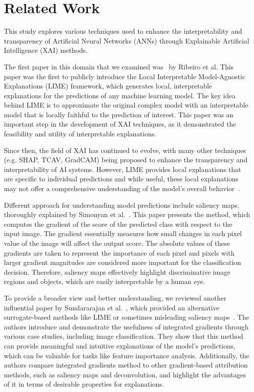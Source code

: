 \documentclass[journal, a4paper]{IEEEtran}
\begin{document}
\section{Related Work}\label{sec:related-work}
This study explores various techniques used to enhance the interpretability and transparency of Artificial Neural Networks (ANNs) through Explainable Artificial Intelligence (XAI) methods.

The first paper in this domain that we examined was~\cite{ribeiro2016should} by Ribeiro et al.
This paper was the first to publicly introduce the Local Interpretable Model-Agnostic Explanations (LIME) framework, which generates local, interpretable explanations for the predictions of any machine learning model.
The key idea behind LIME is to approximate the original complex model with an interpretable model that is locally faithful to the prediction of interest.
This paper was an important step in the development of XAI techniques, as it demonstrated the feasibility and utility of interpretable explanations.

Since then, the field of XAI has continued to evolve, with many other techniques (e.g. SHAP, TCAV, GradCAM) being proposed to enhance the transparency and interpretability of AI systems.
However, LIME provides local explanations that are specific to individual predictions and while useful, these local explanations may not offer a comprehensive understanding of the model's overall behavior~\cite{NIPS2017_8a20a862}.

Different approach for understanding model predictions include saliency maps, thoroughly explained by Simonyan et al.~\cite{Simonyan14a}.
This paper presents the method, which computes the gradient of the score of the predicted class with respect to the input image.
The gradient essentially measures how small changes in each pixel value of the image will affect the output score.
The absolute values of these gradients are taken to represent the importance of each pixel and pixels with larger gradient magnitudes are considered more important for the classification decision.
Therefore, saliency maps effectively highlight discriminative image regions and objects, which are easily interpretable by a human eye.

To provide a broader view and better understanding, we reviewed another influential paper by Sundararajan et al.~\cite{ribeiro2016should}, which provided an alternative surrogate-based methods like LIME or sometimes misleading saliency maps~\cite{adebayo2018sanity}.
The authors introduce and demonstrate the usefulness of integrated gradients through various case studies, including image classification.
They show that this method can provide meaningful and intuitive explanations of the model's predictions, which can be valuable for tasks like feature importance analysis.
Additionally, the authors compare integrated gradients method to other gradient-based attribution methods, such as saliency maps and deconvolution, and highlight the advantages of it in terms of desirable properties for explanations.
\end{document}
